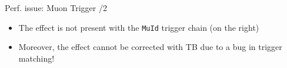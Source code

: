 \begin{frame}{Perf. issue: Muon Trigger /2}

\begin{itemize}
\item The effect is not present with the \texttt{MuId} trigger chain (on the right)
\item Moreover, the effect cannot be corrected with TB due to a bug in trigger matching!
\end{itemize}

\begin{figure}[phtb]
  \begin{center}
 \end{center}
\end{figure}

\end{frame}


